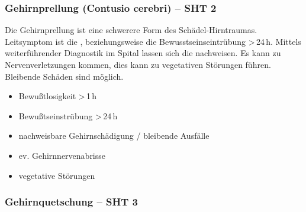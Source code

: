 \subsubsection{Gehirnprellung (Contusio cerebri) --
SHT 2\textdegree}


{
Die Gehirnprellung ist eine schwerere Form des Schädel-Hirntraumas. 
Leitsymptom ist die , beziehungsweise die Bewusstseinseintrübung
 >\,24\,h. Mittels weiterführender Diagnostik im Spital
 lassen sich die  nachweisen. Es kann zu
 Nervenverletzungen kommen, dies kann zu vegetativen Störungen führen.
 Bleibende Schäden sind möglich.
}{
 \begin{itemize}
    \item Bewußtlosigkeit  {\textgreater}\,1\,h
    \item Bewußtseinstrübung {\textgreater}\,24\,h
    \item nachweisbare Gehirnschädigung / bleibende  Ausfälle
    \item ev. Gehirnnervenabrisse 
    \item  vegetative Störungen
\end{itemize}
}{}{}{}







\subsubsection{Gehirnquetschung -- SHT 3{\textdegree}}

